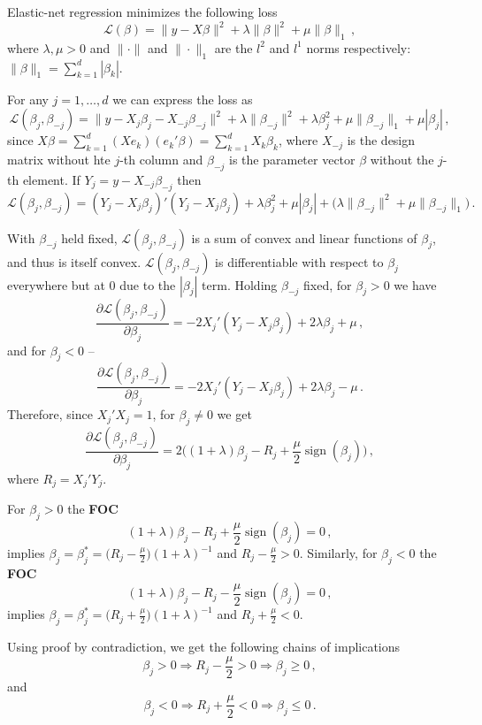 \documentclass[a4paper,12pt]{extarticle}
\newcommand{\sign}{\mathop{\text{sign}}\nolimits}
\begin{document}
Elastic-net regression minimizes the following loss
$$ \mathcal{L} (\beta) = \|y - X\beta\|^2 + \lambda \|\beta \|^2 + \mu \|\beta \|_1 \,, $$
where $\lambda,\mu>0$ and $\|\cdot\|$ and $\|\cdot\|_1$ are the $l^2$ and $l^1$
norms respectively: $\|\beta\|_1 = \sum_{k=1}^d |\beta_k|$.

For any $j=1,\ldots, d$ we can express the loss as 
$$ \mathcal{L} (\beta_j, \beta_{-j})
  = \|y - X_j\beta_j - X_{-j}\beta_{-j}\|^2
  + \lambda \|\beta_{-j} \|^2 + \lambda \beta_j^2
  + \mu \|\beta_{-j} \|_1 + \mu |\beta_j|
  \,, $$
since $X\beta = \sum_{k=1}^d (Xe_k)(e_k'\beta) = \sum_{k=1}^d X_k\beta_k$, where
$X_{-j}$ is the design matrix without hte $j$-th column and $\beta_{-j}$ is the
parameter vector $\beta$ without the $j$-th element. If $Y_j = y - X_{-j}\beta_{-j}$
then
$$ \mathcal{L} (\beta_j, \beta_{-j})
  = (Y_j - X_j\beta_j)'(Y_j - X_j\beta_j) + \lambda \beta_j^2 + \mu |\beta_j|
  + \bigl(\lambda \|\beta_{-j} \|^2 + \mu \|\beta_{-j} \|_1\bigr)
  \,. $$

With $\beta_{-j}$ held fixed, $\mathcal{L} (\beta_j, \beta_{-j})$ is a sum of convex
and linear functions of $\beta_j$, and thus is itself convex. $\mathcal{L} (\beta_j, \beta_{-j})$
is differentiable with respect to $\beta_j$ everywhere but at $0$ due to the $|\beta_j|$
term. Holding $\beta_{-j}$ fixed, for $\beta_j>0$ we have
$$ \frac{\partial \mathcal{L} (\beta_j, \beta_{-j})}{\partial \beta_j}
  = - 2 X_j'(Y_j - X_j\beta_j) + 2\lambda \beta_j + \mu \,, $$
and for $\beta_j < 0$ --
$$ \frac{\partial \mathcal{L} (\beta_j, \beta_{-j})}{\partial \beta_j}
  = - 2 X_j'(Y_j - X_j\beta_j) + 2\lambda \beta_j - \mu \,. $$
Therefore, since $X_j'X_j=1$, for $\beta_j\neq 0$ we get
$$ \frac{\partial \mathcal{L} (\beta_j, \beta_{-j})}{\partial \beta_j}
  = 2\bigl( (1+\lambda) \beta_j - R_j + \frac{\mu}{2} \sign(\beta_j) \bigr) \,, $$
where $R_j = X_j' Y_j$.

For $\beta_j > 0$ the \textbf{FOC}
$$ (1+\lambda) \beta_j - R_j + \frac{\mu}{2} \sign(\beta_j) = 0 \,, $$
implies $\beta_j = \beta_j^* = \biggl(R_j - \frac{\mu}{2}\biggr)(1+\lambda)^{-1}$ and
$R_j - \frac{\mu}{2} > 0$.
Similarly, for $\beta_j < 0$ the \textbf{FOC}
$$ (1+\lambda) \beta_j - R_j - \frac{\mu}{2} \sign(\beta_j) = 0 \,, $$
implies $\beta_j = \beta_j^* = \biggl(R_j + \frac{\mu}{2}\biggr)(1+\lambda)^{-1}$ and
$R_j + \frac{\mu}{2} < 0$.

Using proof by contradiction, we get the following chains of implications
$$ \beta_j > 0 \Rightarrow R_j - \frac{\mu}{2} > 0 \Rightarrow \beta_j\geq 0 \,, $$
and
$$ \beta_j < 0 \Rightarrow R_j + \frac{\mu}{2} < 0 \Rightarrow \beta_j\leq 0 \,. $$
\end{document}
